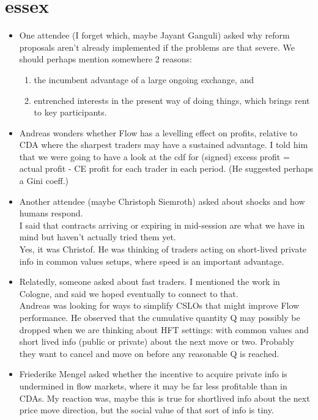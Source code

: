 \documentclass[letter]{article}
\begin{document}
\section{essex}
\begin{itemize}
    \item One attendee (I forget which, maybe Jayant Ganguli) asked why reform proposals aren't already implemented if the problems are that severe. We should perhaps mention somewhere 2 reasons:
        \begin{enumerate}
            \item the incumbent advantage of a large ongoing exchange, and 
            \item entrenched interests in the present way of doing things, which brings rent to key participants.
        \end{enumerate}
    \item Andreas wonders whether Flow has a levelling effect on profits, relative to CDA where the sharpest traders may have a sustained advantage. I told him that we were going to have a look at the cdf for (signed) excess profit = actual profit - CE profit for each trader in each period.  (He suggested perhaps a Gini coeff.)
    \item Another attendee (maybe Christoph Siemroth) asked about shocks and how humans respond. \\
    I said that contracts arriving or expiring in mid-session are what we have in mind but haven't actually tried them yet. \\
    Yes, it was Christof.  He was thinking of traders acting on short-lived private info in common values setups, where speed is an important advantage.
    \item Relatedly, someone asked about fast traders. I mentioned the work in Cologne, and said we hoped eventually to connect to that. \\
    Andreas was looking for ways to simplify CSLOs that might improve Flow performance. He observed that the cumulative quantity Q may possibly be dropped when we are thinking about HFT settings: with common values and short lived info (public or private) about the next move or two. Probably they want to cancel and move on before any reasonable Q is reached.
    \item Friederike Mengel asked whether the incentive to acquire private info is undermined in flow markets, where it may be far less profitable than in CDAs. My reaction was, maybe this is true for shortlived info about the next price move direction, but the social value of that sort of info is tiny.  
\end{itemize}
\end{document}
